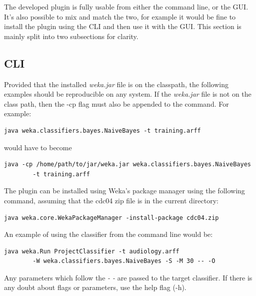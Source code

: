 
The developed plugin is fully usable from either the command line, or the GUI. It's also possible to mix and match the two, for example it would be fine to install the plugin using the CLI and then use it with the GUI. This section is mainly split into two subsections for clarity.

\subsection{CLI}

Provided that the installed \textit{weka.jar} file is on the classpath, the following examples should be reproducible on any system. If the \textit{weka.jar} file is not on the class path, then the -cp flag must also be appended to the command. For example:

\begin{footnotesize}
\begin{verbatim}
java weka.classifiers.bayes.NaiveBayes -t training.arff
\end{verbatim}
\end{footnotesize}
would have to become
\begin{footnotesize}
\begin{verbatim}
java -cp /home/path/to/jar/weka.jar weka.classifiers.bayes.NaiveBayes
        -t training.arff
\end{verbatim}
\end{footnotesize}

The plugin can be installed using Weka's package manager using the following command, assuming that the cdc04 zip file is in the current directory:

\begin{footnotesize}
\begin{verbatim}
java weka.core.WekaPackageManager -install-package cdc04.zip
\end{verbatim}
\end{footnotesize}

An example of using the classifier from the command line would be:

\begin{footnotesize}
\begin{verbatim}
java weka.Run ProjectClassifier -t audiology.arff
        -W weka.classifiers.bayes.NaiveBayes -S -M 30 -- -O
\end{verbatim}
\end{footnotesize}

Any parameters which follow the \textit{- -} are passed to the target classifier. If there is any doubt about flags or parameters, use the help flag (-h).


